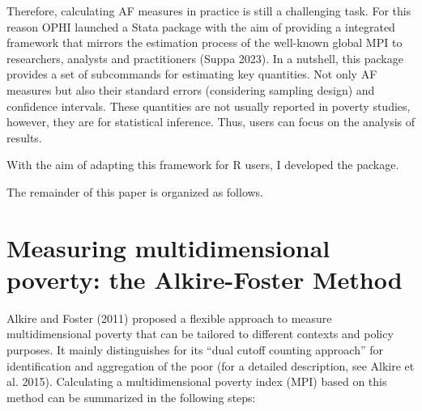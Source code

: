 Therefore, calculating AF measures in practice is still a challenging task. For this reason OPHI launched a Stata package with the aim of providing a integrated framework that mirrors the estimation process of the well-known global MPI to researchers, analysts and practitioners (Suppa 2023). In a nutshell, this package provides a set of subcommands for estimating key quantities. Not only AF measures but also their standard errors (considering sampling design) and confidence intervals. These quantities are not usually reported in poverty studies, however, they are for statistical inference. Thus, users can focus on the analysis of results.

With the aim of adapting this framework for R users, I developed the  package.

The remainder of this paper is organized as follows.

\hypertarget{measuring-multidimensional-poverty-the-alkire-foster-method}{%
\section{Measuring multidimensional poverty: the Alkire-Foster Method}\label{measuring-multidimensional-poverty-the-alkire-foster-method}}

Alkire and Foster (2011) proposed a flexible approach to measure multidimensional poverty that can be tailored to different contexts and policy purposes. It mainly distinguishes for its ``dual cutoff counting approach'' for identification and aggregation of the poor (for a detailed description, see Alkire et al. 2015). Calculating a multidimensional poverty index (MPI) based on this method can be summarized in the following steps:

